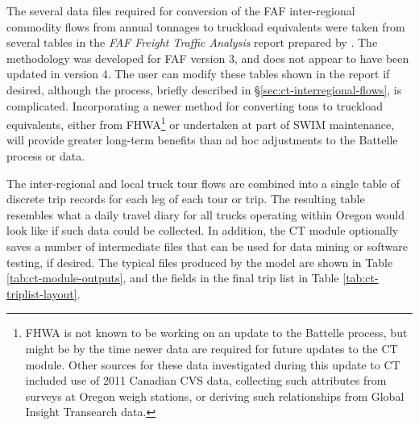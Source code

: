 The several data files required for conversion of the FAF inter-regional commodity flows from annual tonnages to truckload equivalents were taken from several tables in the \textit{FAF Freight Traffic Analysis} report prepared by \cite{battelle11}. The methodology was developed for FAF version 3, and does not appear to have been updated in version 4. The user can modify these tables shown in the report if desired, although the process, briefly described in \S\ref{sec:ct-interregional-flows}, is complicated. Incorporating a newer method for converting tons to truckload equivalents, either from FHWA\footnote{FHWA is not known to be working on an update to the Battelle process, but might be by the time newer data are required for future updates to the CT module. Other sources for these data investigated during this update to CT included use of 2011 Canadian CVS data, collecting such attributes from surveys at Oregon weigh stations, or deriving such relationships from Global Insight Transearch data.} or undertaken at part of SWIM maintenance, will provide greater long-term benefits than ad hoc adjustments to the Battelle process or data.

The inter-regional and local truck tour flows are combined into a single table of discrete trip records for each leg of each tour or trip. The resulting table resembles what a daily travel diary for all trucks operating within Oregon would look like if such data could be collected. In addition, the CT module optionally saves a number of intermediate files that can be used for data mining or software testing, if desired. The typical files produced by the model are shown in Table \ref{tab:ct-module-outputs}, and the fields in the final trip list in Table \ref{tab:ct-triplist-layout}. 




